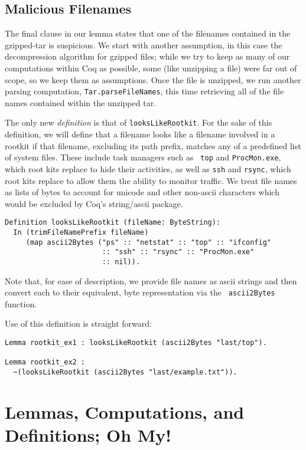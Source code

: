 \documentclass[nocopyrightspace]{sigplanconf}
\begin{document}
\subsection{Malicious Filenames}

The final clause in our lemma states that one of the filenames contained in
the gzipped-tar is suspicious. We start with  another assumption, in this case
the decompression algorithm for gzipped files; while we try to keep as many of
our computations within Coq as possible, some (like unzipping a file) were far
out of scope, so we keep them as assumptions. Once the file is unzipped, we
run another parsing computation, {\tt Tar.parseFileNames}, this time
retrieving all of the file names contained within the unzipped tar.

The only new {\it definition} is that of {\tt looksLikeRootkit}. For the sake
of this definition, we will define that a filename looks like a filename
involved in a rootkit if that filename, excluding its path prefix, matches any
of a predefined list of system files. These include task managers such as {\tt
top} and {\tt ProcMon.exe}, which root kits replace to hide their activities,
as well as {\tt ssh} and {\tt rsync}, which root kits replace to allow them
the ability to monitor traffic. We treat file names as lists of bytes to
account for unicode and other non-ascii characters which would be excluded by
Coq's string/ascii package.

\begin{lstlisting}
Definition looksLikeRootkit (fileName: ByteString):
  In (trimFileNamePrefix fileName) 
     (map ascii2Bytes ("ps" :: "netstat" :: "top" :: "ifconfig" 
                       :: "ssh" :: "rsync" :: "ProcMon.exe" 
                       :: nil)).
\end{lstlisting}

Note that, for ease of description, we provide file names as ascii strings and
then convert each to their equivalent, byte representation via the {\tt
ascii2Bytes} function.

Use of this definition is straight forward:

\begin{lstlisting}
Lemma rootkit_ex1 : looksLikeRootkit (ascii2Bytes "last/top").

Lemma rootkit_ex2 : 
  ~(looksLikeRootkit (ascii2Bytes "last/example.txt")).
\end{lstlisting}

\section{Lemmas, Computations, and Definitions; Oh My!}
\end{document}
